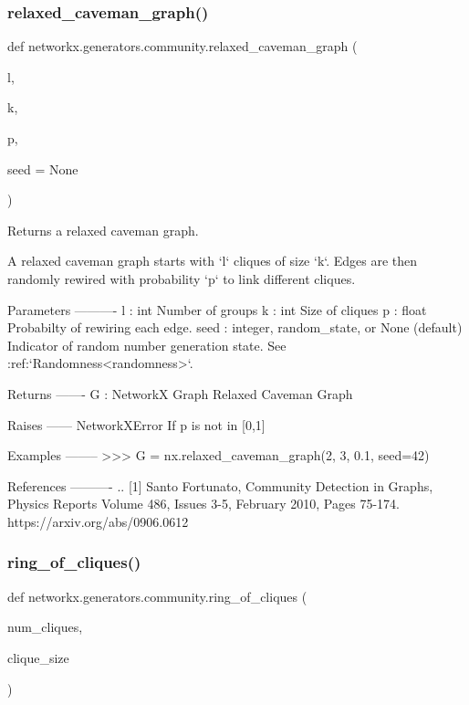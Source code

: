 \subsubsection{\texorpdfstring{relaxed\+\_\+caveman\+\_\+graph()}{relaxed\_caveman\_graph()}}
{\footnotesize\ttfamily def networkx.\+generators.\+community.\+relaxed\+\_\+caveman\+\_\+graph (\begin{DoxyParamCaption}\item[{}]{l,  }\item[{}]{k,  }\item[{}]{p,  }\item[{}]{seed = {\ttfamily None} }\end{DoxyParamCaption})}

\begin{DoxyVerb}Returns a relaxed caveman graph.

A relaxed caveman graph starts with `l` cliques of size `k`.  Edges are
then randomly rewired with probability `p` to link different cliques.

Parameters
----------
l : int
  Number of groups
k : int
  Size of cliques
p : float
  Probabilty of rewiring each edge.
seed : integer, random_state, or None (default)
    Indicator of random number generation state.
    See :ref:`Randomness<randomness>`.

Returns
-------
G : NetworkX Graph
  Relaxed Caveman Graph

Raises
------
NetworkXError
 If p is not in [0,1]

Examples
--------
>>> G = nx.relaxed_caveman_graph(2, 3, 0.1, seed=42)

References
----------
.. [1] Santo Fortunato, Community Detection in Graphs,
   Physics Reports Volume 486, Issues 3-5, February 2010, Pages 75-174.
   https://arxiv.org/abs/0906.0612
\end{DoxyVerb}
 \mbox{\label{namespacenetworkx_1_1generators_1_1community_a08598aa780b4d5021b99d82a6cd499c1}} 
\subsubsection{\texorpdfstring{ring\+\_\+of\+\_\+cliques()}{ring\_of\_cliques()}}
{\footnotesize\ttfamily def networkx.\+generators.\+community.\+ring\+\_\+of\+\_\+cliques (\begin{DoxyParamCaption}\item[{}]{num\+\_\+cliques,  }\item[{}]{clique\+\_\+size }\end{DoxyParamCaption})}

